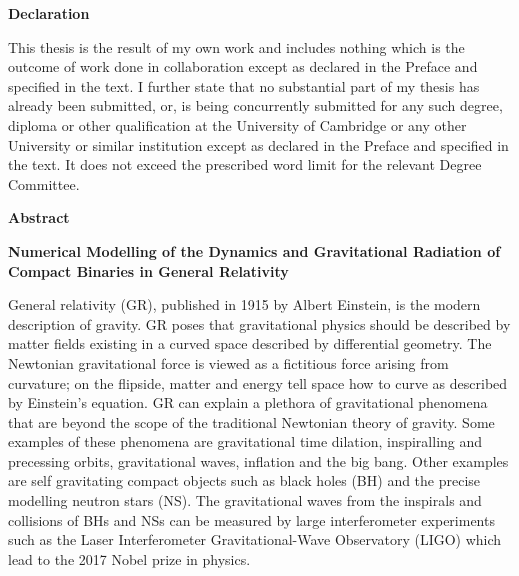 \documentclass[11pt]{report}  %
\numberwithin{equation}{section}
\begin{document}
\begin{center}{\LARGE \bfseries{Declaration}}\end{center}

\vspace{2cm}

This thesis is the result of my own work and includes nothing which is the outcome of work done in collaboration except as declared in the Preface and specified in the text. I further state that no substantial part of my thesis has already been submitted, or, is being concurrently submitted for any such degree, diploma or other qualification at the University of Cambridge or any other University or similar institution except as declared in the Preface and specified in the text. It does not exceed the prescribed word limit for the relevant Degree Committee. 

\vspace{2cm}




\newpage

{\Huge \centering \bfseries Abstract \par} 

\vspace{2cm}

{\large \bfseries Numerical Modelling of the Dynamics and Gravitational Radiation of Compact Binaries in General Relativity \par} \vspace{1cm}

General relativity (GR), published in 1915 by Albert Einstein, is the modern description of gravity. GR poses that gravitational physics should be described by matter fields existing in a curved space described by differential geometry. The Newtonian gravitational force is viewed as a fictitious force arising from curvature; on the flipside, matter and energy tell space how to curve as described by Einstein's equation. GR can explain a plethora of gravitational phenomena that are beyond the scope of the traditional Newtonian theory of gravity. Some examples of these phenomena are gravitational time dilation, inspiralling and precessing orbits, gravitational waves, inflation and the big bang. Other examples are self gravitating compact objects such as black holes (BH) and the precise modelling neutron stars (NS). The gravitational waves from the inspirals and collisions of BHs and NSs can be measured by large interferometer experiments such as the Laser Interferometer Gravitational-Wave Observatory (LIGO) which lead to the 2017 Nobel prize in physics.
\end{document}

